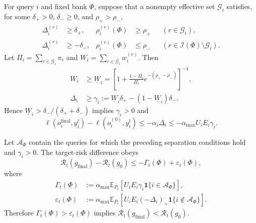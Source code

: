 \begin{theorem}
\label{thm:effective_context_repair}
For query $i$ and fixed bank $\Phi$, suppose that a nonempty effective set
$\mathcal G_i$ satisfies, for
some $\delta_+>0$, $\delta_-\geq0$, and $\rho_+>\rho_-$,
\begin{equation}
\begin{aligned}
\Delta_i^{(r)}&\geq\delta_+,&\rho_i^{(r)}(\Phi)&\geq\rho_+&& (r\in\mathcal G_i),\\
\Delta_i^{(r)}&\geq-\delta_-,&\rho_i^{(r)}(\Phi)&\leq\rho_-&& (r\in\mathcal I(\Phi)\setminus\mathcal G_i).
\end{aligned}
\label{eq:repair_conditions}
\end{equation}
Let $\Pi_i=\sum_{r\in\mathcal G_i}\pi_r$ and
$W_i=\sum_{r\in\mathcal G_i}w_i^{(r)}$.  Then
\begin{equation}
\begin{aligned}
W_i&\geq\underline W_i
=\left[1+\frac{1-\Pi_i}{\Pi_i}
e^{-(\rho_+-\rho_-)}\right]^{-1},\\
\Delta_i&\geq\gamma_i
:=\underline W_i\delta_+-(1-\underline W_i)\delta_-.
\end{aligned}
\label{eq:repair_margin}
\end{equation}
Hence $\underline W_i>\delta_-/(\delta_++\delta_-)$ implies
$\gamma_i>0$ and
\begin{equation}
  \ell(o_i^{\mathrm{final}},y_i^t)-\ell(o_i^{(0)},y_i^t)
  \leq-\alpha_i\Delta_i
  \leq-\alpha_{\max}U_iE_i\gamma_i.
  \label{eq:query_repair_gain}
\end{equation}

Let $\mathcal A_\Phi$ contain the queries for which the preceding separation
conditions hold and $\gamma_i>0$.  The target-risk difference obeys
\begin{equation}
  \mathcal R_t(g_{\mathrm{final}})-\mathcal R_t(g_0)
  \leq-\Gamma_t(\Phi)+\varepsilon_t(\Phi),
  \label{eq:changed_risk_gain}
\end{equation}
where
\begin{equation}
\begin{aligned}
\Gamma_t(\Phi)
&:=\alpha_{\max}\mathbb E_{P_t}
  [U_iE_i\gamma_i\mathbf 1\{i\in\mathcal A_\Phi\}],\\
\varepsilon_t(\Phi)
&:=\alpha_{\max}\mathbb E_{P_t}
  [U_iE_i(-\Delta_i)_+\mathbf 1\{i\notin\mathcal A_\Phi\}].
\end{aligned}
\label{eq:repair_residual_terms}
\end{equation}
Therefore $\Gamma_t(\Phi)>\varepsilon_t(\Phi)$ implies
$\mathcal R_t(g_{\mathrm{final}})<\mathcal R_t(g_0)$.
\end{theorem}

